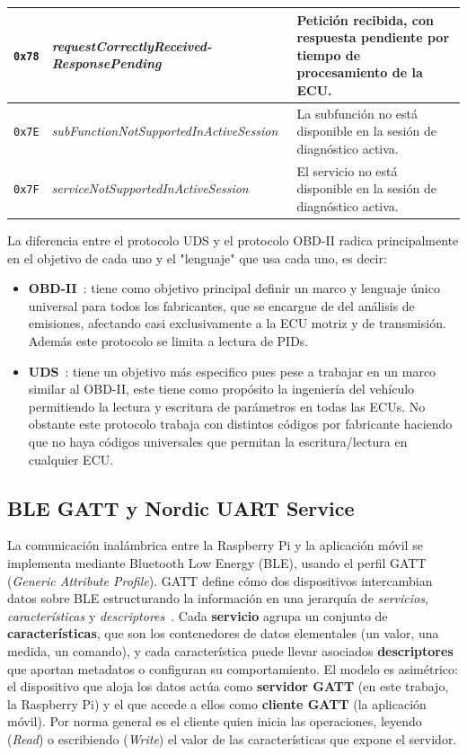 \begin{table}[H]
{\begin{tabular}{|c|l|p{9cm}|}
\hline
\texttt{0x78} & \textit{requestCorrectlyReceived-ResponsePending} & Petición recibida, con respuesta pendiente por tiempo de procesamiento de la ECU. \\
\hline
\texttt{0x7E} & \textit{subFunctionNotSupportedInActiveSession} & La subfunción no está disponible en la sesión de diagnóstico activa. \\
\hline
\texttt{0x7F} & \textit{serviceNotSupportedInActiveSession} & El servicio no está disponible en la sesión de diagnóstico activa. \\
\hline
\end{tabular}%
}
\end{table}
La diferencia entre el protocolo UDS y el protocolo OBD-II radica principalmente en el objetivo de cada uno y el "lenguaje" que usa cada uno, es decir:
\begin{itemize}
    \item \textbf{OBD-II}~\cite{SAEJ1979:2014}: tiene como objetivo principal definir un marco y lenguaje único universal para todos los fabricantes, que se encargue de del análisis de emisiones, afectando casi exclusivamente a la ECU motriz y de transmisión. Además este protocolo se limita a lectura de PIDs.
    \item \textbf{UDS}~\cite{ISO14229-1:2020}: tiene un objetivo más especifico pues pese a trabajar en un marco similar al OBD-II, este tiene como propósito la ingeniería del vehículo permitiendo la lectura y escritura de parámetros en todas las ECUs. No obstante este protocolo trabaja con distintos códigos por fabricante haciendo que no haya códigos universales que permitan la escritura/lectura en cualquier ECU.
\end{itemize} 

\subsection{BLE GATT y Nordic UART Service}
\label{sec:proto_ble}

La comunicación inalámbrica entre la Raspberry Pi y la aplicación móvil se implementa mediante Bluetooth Low Energy (BLE), usando el perfil GATT (\textit{Generic Attribute Profile}). GATT define cómo dos dispositivos intercambian datos sobre BLE estructurando la información en una jerarquía de \textit{servicios}, \textit{características} y \textit{descriptores}~\cite{Bluetooth_CoreSpec}. Cada \textbf{servicio} agrupa un conjunto de \textbf{características}, que son los contenedores de datos elementales (un valor, una medida, un comando), y cada característica puede llevar asociados \textbf{descriptores} que aportan metadatos o configuran su comportamiento. El modelo es asimétrico: el dispositivo que aloja los datos actúa como \textbf{servidor GATT} (en este trabajo, la Raspberry Pi) y el que accede a ellos como \textbf{cliente GATT} (la aplicación móvil). Por norma general es el cliente quien inicia las operaciones, leyendo (\textit{Read}) o escribiendo (\textit{Write}) el valor de las características que expone el servidor.

